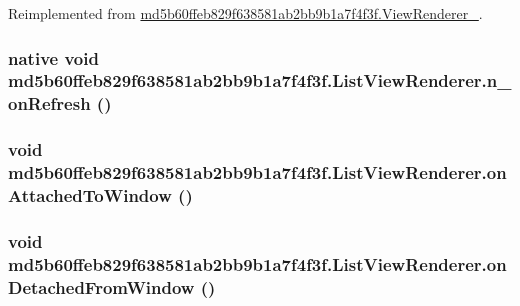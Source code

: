 Reimplemented from \hyperlink{classmd5b60ffeb829f638581ab2bb9b1a7f4f3f_1_1_view_renderer__2_40c528ea52e22dd29fa541de43c0a010}{md5b60ffeb829f638581ab2bb9b1a7f4f3f.ViewRenderer\_}.\hypertarget{classmd5b60ffeb829f638581ab2bb9b1a7f4f3f_1_1_list_view_renderer_1d4e5a793321e64baef8753338b9feea}{
\subsubsection[{n\_\-onRefresh}]{\setlength{\rightskip}{0pt plus 5cm}native void md5b60ffeb829f638581ab2bb9b1a7f4f3f.ListViewRenderer.n\_\-onRefresh ()}}
\label{classmd5b60ffeb829f638581ab2bb9b1a7f4f3f_1_1_list_view_renderer_1d4e5a793321e64baef8753338b9feea}


\hypertarget{classmd5b60ffeb829f638581ab2bb9b1a7f4f3f_1_1_list_view_renderer_e8bbcebd2d1fba70c74cfdf6c44e755d}{
\subsubsection[{onAttachedToWindow}]{\setlength{\rightskip}{0pt plus 5cm}void md5b60ffeb829f638581ab2bb9b1a7f4f3f.ListViewRenderer.onAttachedToWindow ()}}
\label{classmd5b60ffeb829f638581ab2bb9b1a7f4f3f_1_1_list_view_renderer_e8bbcebd2d1fba70c74cfdf6c44e755d}


\hypertarget{classmd5b60ffeb829f638581ab2bb9b1a7f4f3f_1_1_list_view_renderer_d69b0d3bf09e4c1ec70515fab015975e}{
\subsubsection[{onDetachedFromWindow}]{\setlength{\rightskip}{0pt plus 5cm}void md5b60ffeb829f638581ab2bb9b1a7f4f3f.ListViewRenderer.onDetachedFromWindow ()}}
\label{classmd5b60ffeb829f638581ab2bb9b1a7f4f3f_1_1_list_view_renderer_d69b0d3bf09e4c1ec70515fab015975e}


